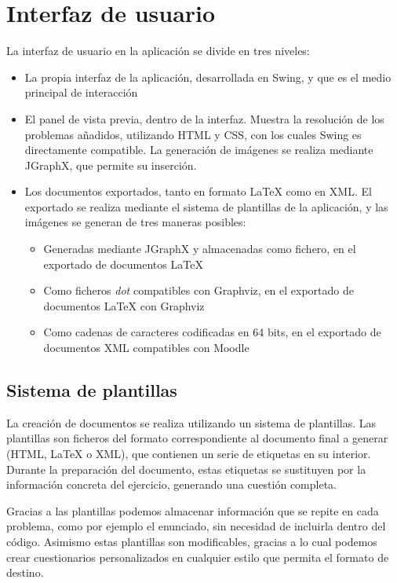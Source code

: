 \section{Interfaz de usuario}
La interfaz de usuario en la aplicación se divide en tres niveles:
\begin{itemize}
	\item La propia interfaz de la aplicación, desarrollada en Swing, y que es el medio principal de interacción
	\item El panel de vista previa, dentro de la interfaz.
	Muestra la resolución de los problemas añadidos, utilizando HTML y CSS, con los cuales Swing es directamente compatible.
	La generación de imágenes se realiza mediante JGraphX, que permite su inserción.
	\item Los documentos exportados, tanto en formato \LaTeX{} como en XML.
	El exportado se realiza mediante el sistema de plantillas de la aplicación, y las imágenes se generan de tres maneras posibles:
	\begin{itemize}
		\item Generadas mediante JGraphX y almacenadas como fichero, en el exportado de documentos \LaTeX{}
		\item Como ficheros \emph{dot} compatibles con Graphviz, en el exportado de documentos \LaTeX{} con Graphviz
		\item Como cadenas de caracteres codificadas en 64 bits, en el exportado de documentos XML compatibles con Moodle
	\end{itemize}
\end{itemize}

\subsection{Sistema de plantillas}
La creación de documentos se realiza utilizando un sistema de plantillas.
Las plantillas son ficheros del formato correspondiente al documento final a generar (HTML, \LaTeX{} o XML), que contienen un serie de etiquetas en su interior.
Durante la preparación del documento, estas etiquetas se sustituyen por la información concreta del ejercicio, generando una cuestión completa.

Gracias a las plantillas podemos almacenar información que se repite en cada problema, como por ejemplo el enunciado, sin necesidad de incluirla dentro del código.
Asimismo estas plantillas son modificables, gracias a lo cual podemos crear cuestionarios personalizados en cualquier estilo que permita el formato de destino.

